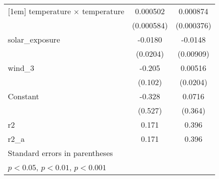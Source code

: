 {\begin{tabular}{l*{2}{c}}
[1em]
temperature $\times$ temperature&    0.000502         &    0.000874         \\
                    &  (0.000584)         &  (0.000376)         \\
[1em]
solar\_exposure      &     -0.0180         &     -0.0148         \\
                    &    (0.0204)         &   (0.00909)         \\
[1em]
wind\_3              &      -0.205         &     0.00516         \\
                    &     (0.102)         &    (0.0204)         \\
[1em]
Constant            &      -0.328         &      0.0716         \\
                    &     (0.527)         &     (0.364)         \\
\hline
r2                  &       0.171         &       0.396         \\
r2\_a                &       0.171         &       0.396         \\
\hline\hline
\multicolumn{3}{l}{\footnotesize Standard errors in parentheses}\\
\multicolumn{3}{l}{\footnotesize \sym{*} \(p<0.05\), \sym{**} \(p<0.01\), \sym{***} \(p<0.001\)}\\
\end{tabular}
}
